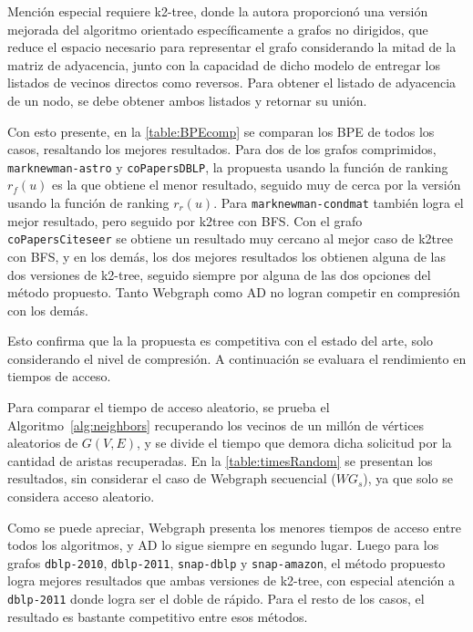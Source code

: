 Mención especial requiere k2-tree, donde la autora proporcionó una versión mejorada del algoritmo orientado específicamente a grafos no dirigidos, que reduce el espacio necesario para representar el grafo considerando la mitad de la matriz de adyacencia, junto con la capacidad de dicho modelo de entregar los listados de vecinos directos como reversos. Para obtener el listado de adyacencia de un nodo, se debe obtener ambos listados y retornar su unión.

Con esto presente, en la \autoref{table:BPEcomp} se comparan los BPE de todos los casos, resaltando los mejores resultados. Para dos de los grafos comprimidos, \texttt{marknewman-astro} y \texttt{coPapersDBLP}, la propuesta usando la función de ranking $r_{f}(u)$ es la que obtiene el menor resultado, seguido muy de cerca por la versión usando la función de ranking $r_{r}(u)$. Para \texttt{marknewman-condmat} también logra el mejor resultado, pero seguido por k2tree con BFS. Con el grafo \texttt{coPapersCiteseer} se obtiene un resultado muy cercano al mejor caso de k2tree con BFS, y en los demás, los dos mejores resultados los obtienen alguna de las dos versiones de k2-tree, seguido siempre por alguna de las dos opciones del método propuesto. Tanto Webgraph como AD no logran competir en compresión con los demás.

Esto confirma que la la propuesta es competitiva con el estado del arte, solo considerando el nivel de compresión. A continuación se evaluara el rendimiento en tiempos de acceso.



Para comparar el tiempo de acceso aleatorio, se prueba el Algoritmo~\ref{alg:neighbors} recuperando los vecinos de un millón de vértices aleatorios de $G(V, E)$, y se divide el tiempo que demora dicha solicitud por la cantidad de aristas recuperadas. En la \autoref{table:timesRandom} se presentan los resultados, sin considerar el caso de Webgraph secuencial ($WG_{s}$), ya que solo se considera acceso aleatorio. 

Como se puede apreciar, Webgraph presenta los menores tiempos de acceso entre todos los algoritmos, y AD lo sigue siempre en segundo lugar. Luego para los grafos \texttt{dblp-2010}, \texttt{dblp-2011}, \texttt{snap-dblp} y \texttt{snap-amazon}, el método propuesto logra mejores resultados que ambas versiones de k2-tree, con especial atención a \texttt{dblp-2011} donde logra ser el doble de rápido. Para el resto de los casos, el resultado es bastante competitivo entre esos métodos.

